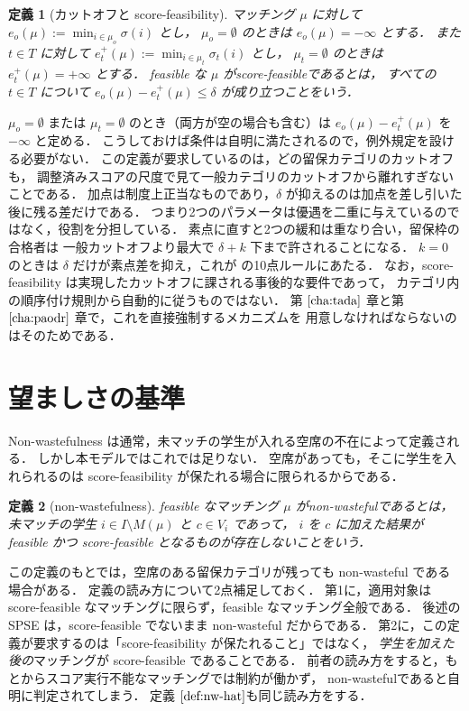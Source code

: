 \documentclass[
    12pt,          %
    a4paper,       %
    oneside,       %
    onecolumn,     %
    titlepage,     %
    final          %
]{jreport} %
\newcommand{\refchapter}[1]{第 $\ref{#1}$ 章}
\newcommand{\refdefinition}[1]{定義 $\ref{#1}$}
\newtheorem{definition}{定義}[chapter]
\begin{document}
\begin{definition}[カットオフと score-feasibility]
\label{def:scorefeas}
マッチング $\mu$ に対して $e_o(\mu):=\min_{i\in\mu_o}\sigma(i)$ とし，
$\mu_o=\emptyset$ のときは $e_o(\mu)=-\infty$ とする．
また $t\in T$ に対して $e_t^+(\mu):=\min_{i\in\mu_t}\sigma_t(i)$ とし，
$\mu_t=\emptyset$ のときは $e_t^+(\mu)=+\infty$ とする．
feasible な $\mu$ が\emph{score-feasible}であるとは，
すべての $t\in T$ について $e_o(\mu)-e_t^+(\mu)\le\delta$ が成り立つことをいう．
\end{definition}

$\mu_o=\emptyset$ または $\mu_t=\emptyset$ のとき（両方が空の場合も含む）は
$e_o(\mu)-e_t^+(\mu)$ を $-\infty$ と定める．
こうしておけば条件は自明に満たされるので，例外規定を設ける必要がない．
この定義が要求しているのは，どの留保カテゴリのカットオフも，
調整済みスコアの尺度で見て一般カテゴリのカットオフから離れすぎないことである．
加点は制度上正当なものであり，$\delta$ が抑えるのは加点を差し引いた後に残る差だけである．
つまり2つのパラメータは優遇を二重に与えているのではなく，役割を分担している．
素点に直すと2つの緩和は重なり合い，留保枠の合格者は
一般カットオフより最大で $\delta+k$ 下まで許されることになる．
$k=0$ のときは $\delta$ だけが素点差を抑え，これが \citet{AyTu23b} の10点ルールにあたる．
なお，score-feasibility は実現したカットオフに課される事後的な要件であって，
カテゴリ内の順序付け規則から自動的に従うものではない．
\refchapter{cha:tada}と\refchapter{cha:paodr}で，これを直接強制するメカニズムを
用意しなければならないのはそのためである．

\section{望ましさの基準}
\label{sec:desiderata}

Non-wastefulness は通常，未マッチの学生が入れる空席の不在によって定義される．
しかし本モデルではこれでは足りない．
空席があっても，そこに学生を入れられるのは score-feasibility が保たれる場合に限られるからである．

\begin{definition}[non-wastefulness]
\label{def:nw}
feasible なマッチング $\mu$ が\emph{non-wasteful}であるとは，
未マッチの学生 $i\in I\setminus M(\mu)$ と $c\in V_i$ であって，
$i$ を $c$ に加えた結果が feasible かつ score-feasible となるものが存在しないことをいう．
\end{definition}

この定義のもとでは，空席のある留保カテゴリが残っても non-wasteful である場合がある．
定義の読み方について2点補足しておく．
第1に，適用対象は score-feasible なマッチングに限らず，feasible なマッチング全般である．
後述の SPSE は，score-feasible でないまま non-wasteful だからである．
第2に，この定義が要求するのは「score-feasibility が保たれること」ではなく，
\emph{学生を加えた後の}マッチングが score-feasible であることである．
前者の読み方をすると，もとからスコア実行不能なマッチングでは制約が働かず，
non-wastefulであると自明に判定されてしまう．
\refdefinition{def:nw-hat}も同じ読み方をする．
\end{document}
